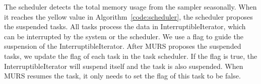 


The scheduler detects the total memory usage from the sampler seasonally. When it reaches the yellow value in Algorithm~\ref{code:scheduler}, the scheduler proposes the suspended tasks. All tasks process the data in {\ttfamily \small InterruptibleIterator}, which can be interrupted by the system or the scheduler. We use a flag to guide the suspension of the {\ttfamily \small InterruptibleIterator}. After MURS proposes the suspended tasks, we update the flag of each task in the task scheduler. If the flag is true, the {\ttfamily \small InterruptibleIterator} will suspend itself and the task is also suspended. When MURS resumes the task, it only needs to set the flag of this task to be false.


